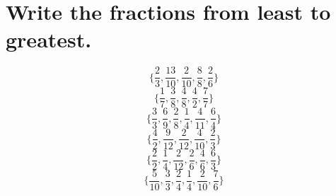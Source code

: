 \documentclass[12pt, fleqn, leqno]{article}
\begin{document}
\section*{Write the fractions from least to greatest.}
\thispagestyle{plain}
        \begin{equation}\{\frac{2}{3}, \frac{13}{10}, \frac{2}{10}, \frac{8}{8}, \frac{2}{6}\}\end{equation}
        \vspace{4cm}
        \begin{equation}\{\frac{1}{7}, \frac{3}{8}, \frac{4}{8}, \frac{4}{2}, \frac{7}{7}\}\end{equation}
        \vspace{4cm}
        \begin{equation}\{\frac{3}{3}, \frac{6}{9}, \frac{2}{8}, \frac{1}{4}, \frac{4}{11}, \frac{6}{4}\}\end{equation}
        \vspace{4cm}
        \begin{equation}\{\frac{4}{2}, \frac{9}{12}, \frac{2}{12}, \frac{4}{10}, \frac{2}{3}\}\end{equation}
        \vspace{4cm}
        \begin{equation}\{\frac{2}{2}, \frac{1}{4}, \frac{2}{12}, \frac{2}{6}, \frac{4}{6}, \frac{6}{3}\}\end{equation}
        \vspace{4cm}
        \begin{equation}\{\frac{5}{10}, \frac{3}{3}, \frac{2}{4}, \frac{1}{4}, \frac{2}{10}, \frac{7}{6}\}\end{equation}
        \vspace{4cm}
\newpage

    
\end{document}
